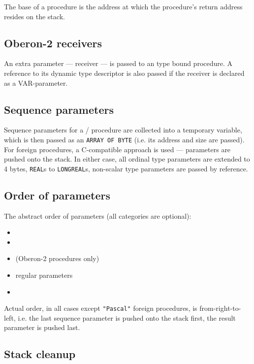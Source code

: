 The base of a procedure is the address at which the procedure's
return address resides on the stack.

\subsection{Oberon-2 receivers}
\label{lowlevel:conv:o2receivers}

An extra parameter --- receiver --- is passed to an \ot{} type
bound procedure. A reference to its dynamic type descriptor
is also passed if the receiver is declared as a VAR-parameter.

\subsection{Sequence parameters}
\label{lowlevel:conv:seq}

Sequence parameters for a \mt{}/\ot{} procedure are collected
into a temporary variable, which is then passed as an \verb'ARRAY OF BYTE'
(i.e. its address and size are passed). For foreign procedures,
a C-compatible approach is used --- parameters are pushed onto the
stack. In either case, all ordinal type parameters are extended to
4 bytes, \verb'REAL's to \verb'LONGREAL's, non-scalar type parameters are
passed by reference.

\subsection{Order of parameters}

The abstract order of parameters (all categories are optional):

\begin{itemize}
\item {}
\item {}
\item {} (Oberon-2 procedures only)
\item regular parameters
\item {}
\end{itemize}

Actual order, in all cases except \verb'"Pascal"' foreign procedures,
is from-right-to-left, i.e. the last sequence parameter is pushed
onto the stack first, the result parameter is pushed last.

\subsection{Stack cleanup}

